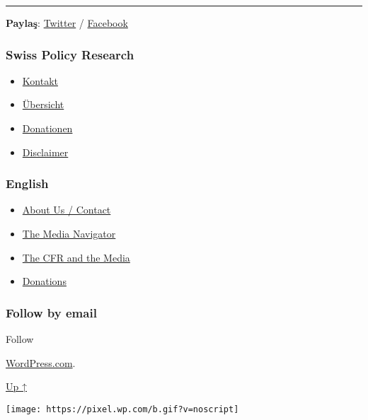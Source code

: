 \begin{center}\rule{0.5\linewidth}{\linethickness}\end{center}

\textbf{Paylaş}:
\href{https://twitter.com/intent/tweet?url=https://swprs.org/a-swiss-doctor-on-covid-19/}{Twitter}
/
\href{https://www.facebook.com/share.php?u=https://swprs.org/a-swiss-doctor-on-covid-19/}{Facebook}

\hypertarget{swiss-policy-research}{%
\subsubsection{Swiss Policy Research}\label{swiss-policy-research}}

\begin{itemize}
\tightlist
\item
  \href{https://swprs.org/kontakt/}{Kontakt}
\item
  \href{https://swprs.org/uebersicht/}{Übersicht}
\item
  \href{https://swprs.org/donationen/}{Donationen}
\item
  \href{https://swprs.org/disclaimer/}{Disclaimer}
\end{itemize}

\hypertarget{english}{%
\subsubsection{English}\label{english}}

\begin{itemize}
\tightlist
\item
  \href{https://swprs.org/contact/}{About Us / Contact}
\item
  \href{https://swprs.org/media-navigator/}{The Media Navigator}
\item
  \href{https://swprs.org/the-american-empire-and-its-media/}{The CFR
  and the Media}
\item
  \href{https://swprs.org/donations/}{Donations}
\end{itemize}

\hypertarget{follow-by-email}{%
\subsubsection{Follow by email}\label{follow-by-email}}

Follow

\href{https://wordpress.com/?ref=footer_custom_com}{WordPress.com}.

\protect\hyperlink{}{Up ↑}

\texttt{[image: https://pixel.wp.com/b.gif?v=noscript]}
